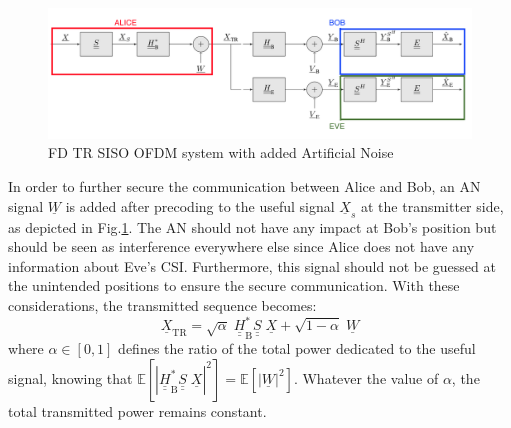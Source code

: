 \documentclass[conference]{IEEEtran}
\begin{document}
\begin{figure}[t]
    \centering
    \centerline{\includegraphics[width = .53\textwidth]{img/scheme_AN.png}}
    \caption{FD TR SISO OFDM system with added Artificial Noise}
    \label{fig:TR_FD_AN}
\end{figure}
In order to further secure the communication between Alice and Bob, an AN signal $\underline{W}$ is added after precoding to the useful signal $\underline{X}_s$ at the transmitter side, as depicted in Fig.\ref{fig:TR_FD_AN}. The AN should not have any impact at Bob's position but should be seen as interference everywhere else since Alice does not have any information about Eve's CSI. Furthermore, this signal should not be guessed at the unintended positions to ensure the secure communication. With these considerations, the transmitted sequence becomes:
\begin{equation}
    \underline{X}_{\text{TR}} = \sqrt{\alpha} \;\underline{\underline{H}}_{\text{B}}^*  \underline{\underline{S}}\; \underline{X} +  \sqrt{1-\alpha} \; \underline{W}
    \label{eq:sym_rad_AN}
\end{equation} 
where $\alpha \in [0,1]$ defines the ratio of the total power dedicated to the useful signal, knowing that $\mathbb{E}\left[ \left|\underline{\underline{H}}_{\text{B}}^*  \underline{\underline{S}}\; \underline{X}  \right|^2 \right] = \mathbb{E}\left[ \left|\underline{W} \right|^2 \right]$. Whatever the value of $\alpha$, the total transmitted power remains constant.
\end{document}

